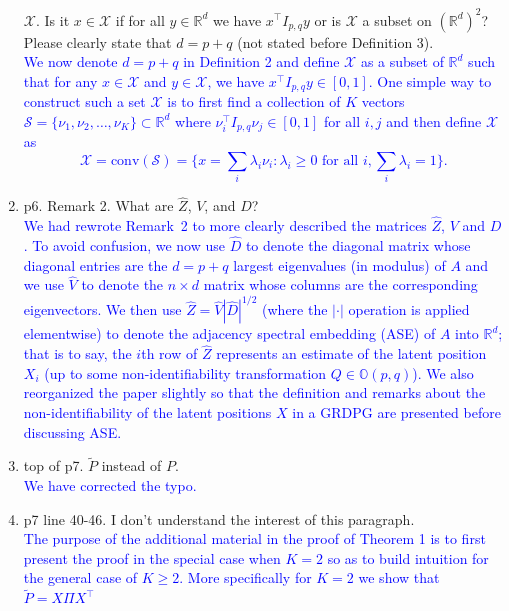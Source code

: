 \documentclass[
]{article}
\begin{document}
\begin{enumerate}
  \(\mathcal{X}\). Is it \(x \in \mathcal{X}\) if for all
  \(y \in \mathbb{R}^d\) we have \(x^\top I_{p,q} y\) or is
  \(\mathcal{X}\) a subset on \((\mathbb{R}^d)^2\)? Please clearly state
  that \(d = p + q\) (not stated before Definition 3).\\
  \textcolor{blue}{
  We now denote $d = p + q$ in Definition 2 and define $\mathcal{X}$ as a subset of $\mathbb{R}^{d}$ such
  that for any $x \in \mathcal{X}$ and $y \in \mathcal{X}$, we have
  $x^{\top} I_{p,q} y \in [0,1]$. One simple way to construct such a set
  $\mathcal{X}$ is to first find a collection of $K$ vectors
  $\mathcal{S} = \{\nu_1, \nu_2, \dots, \nu_K\} \subset \mathbb{R}^{d}$
  where $\nu_i^{\top} I_{p,q} \nu_j \in [0,1]$ for all $i,j$ and then define $\mathcal{X}$
  as 
  $$\mathcal{X} = \mathrm{conv}(\mathcal{S}) = \{x = \sum_{i} \lambda_i \nu_i \colon \lambda_i \geq 0 \,\, \text{for all $i$}, \sum_{i} \lambda_i =
  1\}.$$
  }
\item
  p6. Remark 2. What are \(\hat{Z}\), \(V\), and \(D\)?\\
  \textcolor{blue}{
  We had rewrote Remark~2 to more clearly described the matrices
  $\hat{Z}$, $V$ and $D$. To avoid confusion, we now use $\hat{D}$ to
  denote the diagonal matrix whose diagonal entries are the $d = p + q$
  largest eigenvalues (in modulus) of $A$ and we use $\hat{V}$ to denote
  the $n \times d$ matrix whose columns are the corresponding
  eigenvectors. We then use $\hat{Z} = \hat{V} |\hat{D}|^{1/2}$ (where
  the $|\cdot|$ operation is applied elementwise) to denote the
  adjacency spectral embedding (ASE) of $A$ into $\mathbb{R}^{d}$; that is
  to say, the $i$th row of $\hat{Z}$ represents an estimate of the
  latent position $X_i$ (up to some non-identifiability transformation
  $Q \in \mathbb{O}(p,q)$). We also reorganized the paper slightly so
  that the definition and remarks about the non-identifiability of the
  latent positions $X$ in a GRDPG are presented before discussing ASE. }
\item
  top of p7. \(\tilde{P}\) instead of \({P}\).\\
  \textcolor{blue}{
  We have corrected the typo. 
  }
\item
  p7 line 40-46. I don't understand the interest of this paragraph.\\
  \textcolor{blue}{
  The purpose of the additional material in the proof of Theorem 1 is to
  first present the proof in the special case when $K = 2$ so as to
  build intuition for the general case of $K \geq 2$. 
  More specifically for $K = 2$ we show that $\tilde{P} = X \Pi X^\top$
}
\end{enumerate}
\end{document}

